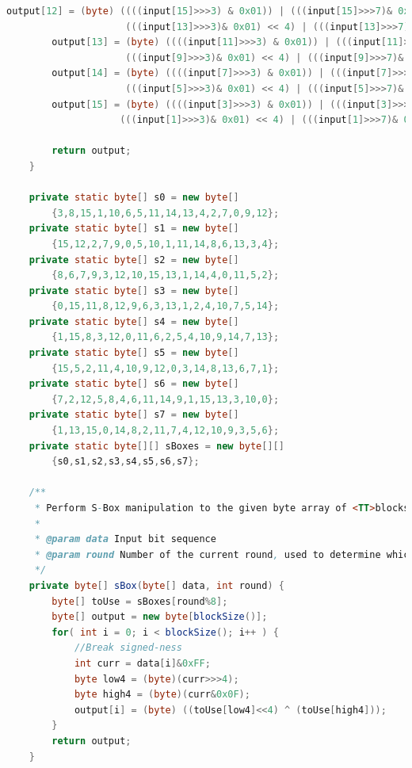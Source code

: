 \documentclass[12pt]{article} %
\begin{document}
\begin{lstlisting}[language=Java, basicstyle=\small, breaklines=true]
        output[12] = (byte) ((((input[15]>>>3) & 0x01)) | (((input[15]>>>7)& 0x01) << 1) | (((input[14]>>>3)& 0x01) << 2) | (((input[14]>>>7)& 0x01) << 3) | 
                     (((input[13]>>>3)& 0x01) << 4) | (((input[13]>>>7)& 0x01) << 5) | (((input[12]>>>3)& 0x01) << 6) | (((input[12]>>>7)& 0x01) << 7));
        output[13] = (byte) ((((input[11]>>>3) & 0x01)) | (((input[11]>>>7)& 0x01) << 1) | (((input[10]>>>3)& 0x01) << 2) | (((input[10]>>>7)& 0x01) << 3) | 
                     (((input[9]>>>3)& 0x01) << 4) | (((input[9]>>>7)& 0x01) << 5) | (((input[8]>>>3)& 0x01) << 6) | (((input[8]>>>7)& 0x01) << 7));
        output[14] = (byte) ((((input[7]>>>3) & 0x01)) | (((input[7]>>>7)& 0x01) << 1) | (((input[6]>>>3)& 0x01) << 2) | (((input[6]>>>7)& 0x01) << 3) | 
                     (((input[5]>>>3)& 0x01) << 4) | (((input[5]>>>7)& 0x01) << 5) | (((input[4]>>>3)& 0x01) << 6) | (((input[4]>>>7)& 0x01) << 7));
        output[15] = (byte) ((((input[3]>>>3) & 0x01)) | (((input[3]>>>7)& 0x01) << 1) | (((input[2]>>>3)& 0x01) << 2) | (((input[2]>>>7)& 0x01) << 3) | 
                    (((input[1]>>>3)& 0x01) << 4) | (((input[1]>>>7)& 0x01) << 5) | (((input[0]>>>3)& 0x01) << 6) | (((input[0]>>>7)& 0x01) << 7));

    	return output; 
    }

    private static byte[] s0 = new byte[]
        {3,8,15,1,10,6,5,11,14,13,4,2,7,0,9,12};
    private static byte[] s1 = new byte[]
        {15,12,2,7,9,0,5,10,1,11,14,8,6,13,3,4};
    private static byte[] s2 = new byte[]
        {8,6,7,9,3,12,10,15,13,1,14,4,0,11,5,2};
    private static byte[] s3 = new byte[]
        {0,15,11,8,12,9,6,3,13,1,2,4,10,7,5,14};
    private static byte[] s4 = new byte[]
        {1,15,8,3,12,0,11,6,2,5,4,10,9,14,7,13};
    private static byte[] s5 = new byte[]
        {15,5,2,11,4,10,9,12,0,3,14,8,13,6,7,1};
    private static byte[] s6 = new byte[]
        {7,2,12,5,8,4,6,11,14,9,1,15,13,3,10,0};
    private static byte[] s7 = new byte[]
        {1,13,15,0,14,8,2,11,7,4,12,10,9,3,5,6};
    private static byte[][] sBoxes = new byte[][]
        {s0,s1,s2,s3,s4,s5,s6,s7};

    /**
     * Perform S-Box manipulation to the given byte array of <TT>blocksize()</TT> length.
     *
     * @param data Input bit sequence
     * @param round Number of the current round, used to determine which S-Box to use.
     */
    private byte[] sBox(byte[] data, int round) {
        byte[] toUse = sBoxes[round%8];
        byte[] output = new byte[blockSize()];
        for( int i = 0; i < blockSize(); i++ ) {
            //Break signed-ness
            int curr = data[i]&0xFF;
            byte low4 = (byte)(curr>>>4);
            byte high4 = (byte)(curr&0x0F);
            output[i] = (byte) ((toUse[low4]<<4) ^ (toUse[high4]));
        }
        return output;
    }


\end{lstlisting}
\end{document}

